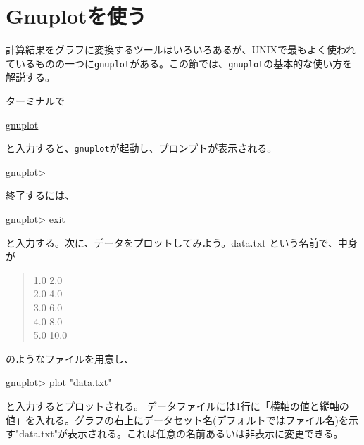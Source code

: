 {%

\section{Gnuplotを使う}
\label{sec:unix:gnuplot}

計算結果をグラフに変換するツールはいろいろあるが、UNIXで最もよく使われているものの一つに{\tt gnuplot}がある。この節では、{\tt gnuplot}の基本的な使い方を解説する。

ターミナルで
\begin{commandline2}
\prompt \underline{gnuplot}
\end{commandline2} \noindent
と入力すると、{\tt gnuplot}が起動し、プロンプトが表示される。
\begin{commandline2}
gnuplot>
\end{commandline2} \noindent
終了するには、
\begin{commandline2}
gnuplot> \underline{exit}
\end{commandline2} \noindent
と入力する。次に、データをプロットしてみよう。data.txt という名前で、中身が
\begin{quote}
 1.0 2.0 \\
 2.0 4.0 \\
 3.0 6.0 \\
 4.0 8.0 \\
 5.0 10.0
\end{quote}
のようなファイルを用意し、
\begin{commandline2}
gnuplot> \underline{plot "data.txt"}
\end{commandline2} \noindent
と入力するとプロットされる。 データファイルには1行に「横軸の値と縦軸の値」を入れる。グラフの右上にデータセット名(デフォルトではファイル名)を示す"data.txt"が表示される。これは任意の名前あるいは非表示に変更できる。

}
